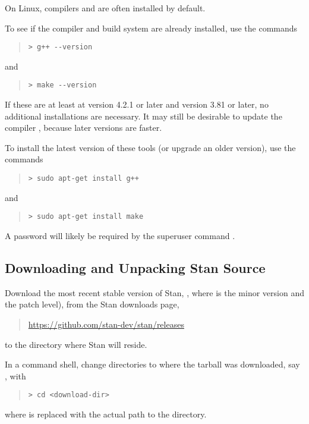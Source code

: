 On Linux, \Cpp compilers and  are often installed by default.

To see if the  compiler and  build system
are already installed, use the commands
%
\begin{quote}
\begin{Verbatim}[fontshape=sl,fontsize=\small]
> g++ --version
\end{Verbatim}
\end{quote}
% 
and
%
\begin{quote}
\begin{Verbatim}[fontshape=sl,fontsize=\small]
> make --version
\end{Verbatim}
\end{quote}
%

If these are at least at  version 4.2.1 or later and 
version 3.81 or later, no additional installations are necessary.  It
may still be desirable to update the \Cpp compiler , because
later versions are faster.

To install the latest version of these
tools (or upgrade an older version), use the commands
%
\begin{quote}
\begin{Verbatim}[fontshape=sl,fontsize=\small]
> sudo apt-get install g++ 
\end{Verbatim}
\end{quote}
%
and
%
\begin{quote}
\begin{Verbatim}[fontshape=sl,fontsize=\small]
> sudo apt-get install make 
\end{Verbatim}
\end{quote}
% 
A password will likely be required by the superuser command .


\subsection{Downloading and Unpacking Stan Source}

Download the most recent stable version of Stan,
, where  is the minor version and
 the patch level), from the Stan downloads page,
%
\begin{quote}
\url{https://github.com/stan-dev/stan/releases}
\end{quote}
%
to the directory where Stan will reside.

In a command shell, change directories to where the
tarball was downloaded, say , with
%
\begin{quote}
\begin{Verbatim}[fontshape=sl,fontsize=\small]
> cd <download-dir>
\end{Verbatim}
\end{quote}
%
where  is replaced with the actual path to the directory.

